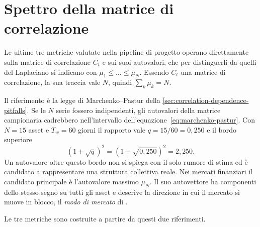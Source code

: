 \section{Spettro della matrice di correlazione}
\label{sec:topo-spectral}

Le ultime tre metriche valutate nella pipeline di progetto operano direttamente sulla matrice di correlazione $C_t$ e sui suoi autovalori, che per distinguerli da quelli del Laplaciano si indicano con $\mu_1\leq\dots\leq\mu_N$. Essendo $C_t$ una matrice di correlazione, la sua traccia vale $N$, quindi $\sum_k\mu_k=N$.

Il riferimento è la legge di Marchenko--Pastur della \cref{sec:correlation-dependence-pitfalls}. Se le $N$ serie fossero indipendenti, gli autovalori della matrice campionaria cadrebbero nell'intervallo dell'equazione~\eqref{eq:marchenko-pastur}. Con $N=15$ asset e $T_w=60$ giorni il rapporto vale $q=15/60=0{,}250$ e il bordo superiore
$$(1+\sqrt q)^2 = (1+\sqrt{0{,}250})^2 = 2{,}250.$$
Un autovalore oltre questo bordo non si spiega con il solo rumore di stima ed è candidato a rappresentare una struttura collettiva reale. Nei mercati finanziari il candidato principale è l'autovalore massimo $\mu_N$. Il suo autovettore ha componenti dello stesso segno su tutti gli asset e descrive la direzione in cui il mercato si muove in blocco, il \emph{modo di mercato} di \textcite{laloux1999noise}.

Le tre metriche sono costruite a partire da questi due riferimenti.

